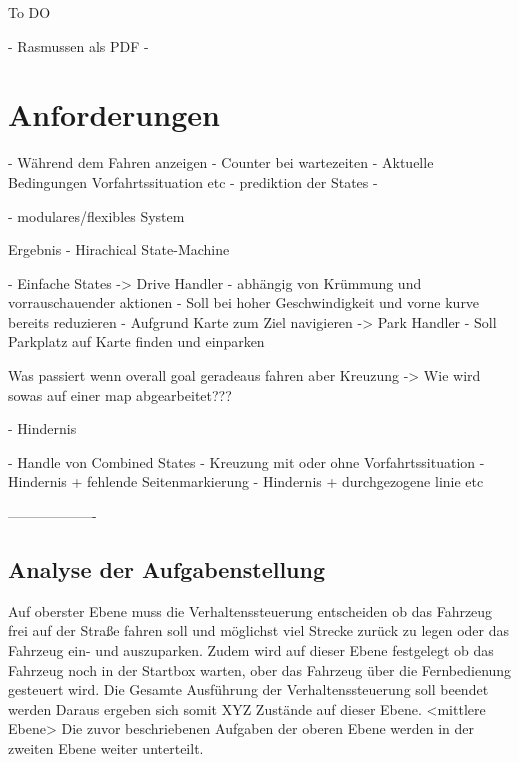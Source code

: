 To DO

- Rasmussen als PDF
- 






















\chapter{Anforderungen}

- Während dem Fahren anzeigen
    - Counter bei wartezeiten
    - Aktuelle Bedingungen Vorfahrtssituation etc
- prediktion der States
- 

- modulares/flexibles System


Ergebnis 
    - Hirachical State-Machine

- Einfache States
    -> Drive Handler
        - abhängig von Krümmung und vorrauschauender aktionen
        - Soll bei hoher Geschwindigkeit und vorne kurve bereits reduzieren
        - Aufgrund Karte zum Ziel navigieren
    -> Park Handler
        - Soll Parkplatz auf Karte finden und einparken
        

Was passiert wenn overall goal geradeaus fahren aber Kreuzung
    -> Wie wird sowas auf einer map abgearbeitet???

        
     
        
    - Hindernis
    
    
- Handle von Combined States
    - Kreuzung mit oder ohne Vorfahrtssituation
    - Hindernis + fehlende Seitenmarkierung
    - Hindernis + durchgezogene linie etc
    
    -------------------
    
    
    \section{Analyse der Aufgabenstellung}
Auf oberster Ebene muss die Verhaltenssteuerung entscheiden ob das Fahrzeug frei auf der Straße fahren soll und möglichst viel Strecke zurück zu legen oder das Fahrzeug ein- und auszuparken. Zudem wird auf dieser Ebene festgelegt ob das Fahrzeug noch in der Startbox warten, ober das Fahrzeug über  die Fernbedienung gesteuert wird. Die Gesamte Ausführung der Verhaltenssteuerung soll beendet werden 
Daraus ergeben sich somit XYZ Zustände auf dieser Ebene.
<mittlere Ebene>
Die zuvor beschriebenen Aufgaben der oberen Ebene werden in der zweiten Ebene weiter unterteilt. 

